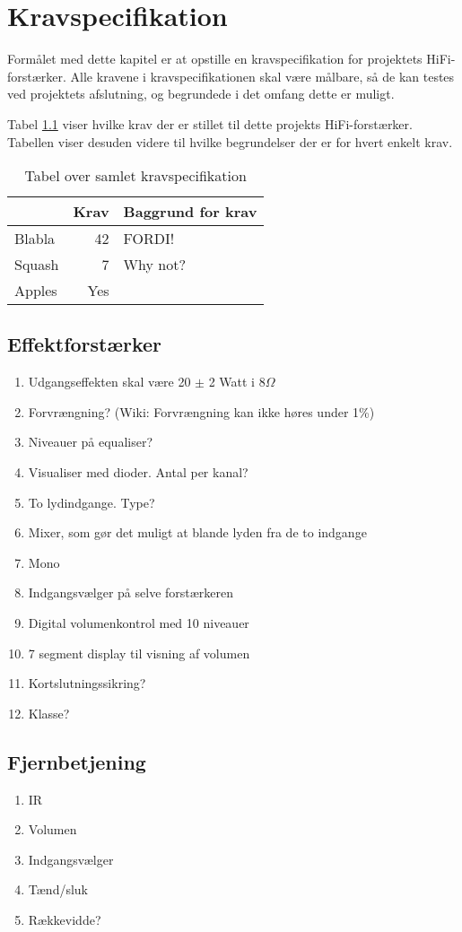 \chapter{Kravspecifikation}
\label{kravspec}
Formålet med dette kapitel er at opstille en kravspecifikation for projektets HiFi-forstærker. Alle kravene i kravspecifikationen skal være målbare, så de kan testes ved projektets afslutning, og begrundede i det omfang dette er muligt. 

Tabel \ref{tab:kravspec} viser hvilke krav der er stillet til dette projekts HiFi-forstærker. Tabellen viser desuden videre til hvilke begrundelser der er for hvert enkelt krav.
\begin{table}[h]
\centering
\begin{tabular}{l|r|l}
\hline\hline
 & Krav & Baggrund for krav \\
\hline\hline
Blabla & 42 & FORDI! \\
Squash & 7 & Why not? \\
\hline
Apples & Yes & \\
\hline\hline
\end{tabular}
\caption{Tabel over samlet kravspecifikation}
\label{tab:kravspec}
\end{table}
\section*{Effektforstærker}
\begin{enumerate}
\item Udgangseffekten skal være 20 $\pm$ 2 Watt i 8$\Omega$
\item Forvrængning? (Wiki: Forvrængning kan ikke høres under 1\%)
\item Niveauer på equaliser?
\item Visualiser med dioder. Antal per kanal?
\item To lydindgange. Type?
\item Mixer, som gør det muligt at blande lyden fra de to indgange
\item Mono
\item Indgangsvælger på selve forstærkeren
\item Digital volumenkontrol med 10 niveauer
\item 7 segment display til visning af volumen
\item Kortslutningssikring?
\item Klasse?
\end{enumerate}

\section*{Fjernbetjening}
\begin{enumerate}
\item IR
\item Volumen
\item Indgangsvælger
\item Tænd/sluk
\item Rækkevidde?
\end{enumerate}